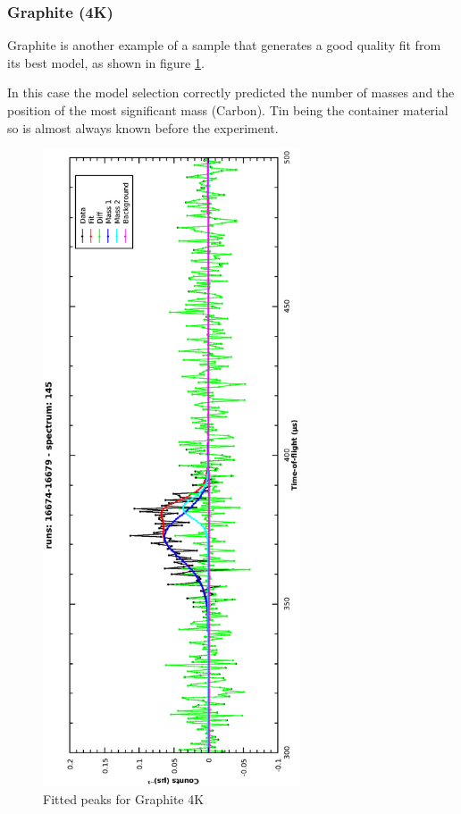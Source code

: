 \documentclass[a4paper]{article}
\begin{document}
\subsubsection{Graphite (4K)}

Graphite is another example of a sample that generates a good quality fit from
its best model, as shown in figure \ref{fig:model_sel_graphite_4k}.

In this case the model selection correctly predicted the number of masses and
the position of the most significant mass (Carbon). Tin being the container
material so is almost always known before the experiment.

\begin{figure}[h!]
  \centering
  \vspace{-60pt}
  \begin{turn}{-90}
    \includegraphics[width=0.68\textwidth]{graphics/model_sel_graphite_4k.eps}
  \end{turn}
  \vspace{-60pt}
  \caption{Fitted peaks for Graphite 4K}
  \label{fig:model_sel_graphite_4k}
\end{figure}
\FloatBarrier
\end{document}
